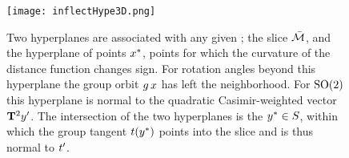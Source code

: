 \begin{description}
 \begin{figure}
 \begin{center}
 \texttt{[image: inflectHype3D.png]}
 \end{center}
 \caption{\label{fig:inflectHype3D}
Two hyperplanes are associated with  any given {\template} \slicep; the
slice $\bar{\cal M}$, and the hyperplane of points $x^*$, points for which
the curvature of the distance function  changes sign.
For rotation angles beyond this hyperplane the group orbit
$g\,x$ has left the {\template} neighborhood. For $\textrm{SO}(2)$ this
hyperplane is normal to the quadratic Casimir-weighted vector
$\mathbf{T}^2{y'}$. The intersection of the two hyperplanes is the {\em
\sset} $y^* \in S$, within which the group tangent
$t(y^*)$ points into the slice and is thus normal to
$t'_{}$.
 }%
 \end{figure}

\end{description}
